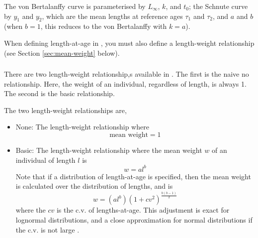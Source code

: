 The von Bertalanffy curve is parameterised by $L_\infty$, $k$, and $t_0$; the Schnute curve \citep{836} by $y_1$ and $y_2$, which are the mean lengths at reference ages $\tau_1$ and $\tau_2$, and $a$ and $b$ (when $b=1$, this reduces to the von Bertalanffy with $k=a$). 

When defining length-at-age in \CNAME, you must also define a length-weight relationship (see Section \ref{sec:mean-weight} below).

\subsubsection*{}

\subsubsection*{}

\subsubsection*{\label{sec:mean-weight}}

There are two length-weight relationship,s available in \CNAME. The first is the naive no relationship. Here, the weight of an individual, regardless of length, is always 1. The second is the basic relationship. 

The two length-weight relationships are,

\begin{itemize}
  \item{None:} The length-weight relationship where  
  \begin{equation}
    \text{mean weight}=1
  \end{equation}
  \item{Basic:} The length-weight relationship where the mean weight $w$ of an individual of length $l$ is
  \begin{equation}
    w=a l^b
  \end{equation}
	Note that if a distribution of length-at-age is specified, then the mean weight is calculated over the distribution of lengths, and is
  \begin{equation}
	  w=(al^b)(1+cv^2)^{\frac{b(b-1)}{2}}
  \end{equation}
	where the $cv$ is the c.v. of lengths-at-age. This adjustment is exact for lognormal distributions, and a close approximation for normal distributions if the c.v. is not large \citep{1388}.
\end{itemize}

